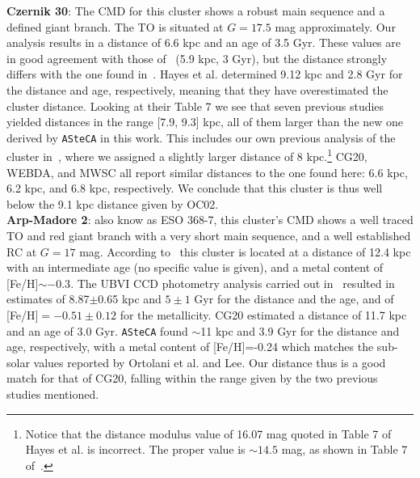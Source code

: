 \documentclass[draft]{aa}
\begin{document}
  \textbf{Czernik 30}: The CMD for this cluster shows a robust main sequence
  and a defined giant branch. The TO is situated at $G=17.5$ mag approximately.
  Our analysis results in a distance of 6.6 kpc and an age of 3.5 Gyr. These
  values are in good agreement with those of~\cite{Dias_2021} (5.9 kpc, 3 Gyr),
  but the distance strongly differs with the one found in~\cite{Hayes_2015}.
  Hayes et al. determined 9.12 kpc and 2.8 Gyr for the distance and age,
  respectively, meaning that they have overestimated the cluster distance.
  Looking at their Table 7 we see that seven previous studies yielded distances
  in the range [7.9, 9.3] kpc, all of them larger than the new one derived by
  \texttt{ASteCA} in this work. This includes our own previous analysis of the
  cluster in~\cite{Perren_2015}, where we assigned a slightly larger distance of
  8 kpc.\footnote{Notice that the distance modulus value of 16.07 mag quoted in
  Table 7 of Hayes et al. is incorrect. The proper value is $\sim14.5$ mag, as
  shown in Table 7 of~\cite{Perren_2015}.}
  CG20, WEBDA, and MWSC all report similar distances to the one found here:
  6.6 kpc, 6.2 kpc, and 6.8 kpc, respectively. We conclude that this cluster
  is thus well below the 9.1 kpc distance given by OC02.\\

  \textbf{Arp-Madore 2}: also know as ESO 368-7, this cluster's CMD shows
  a well traced TO and red giant branch with a very short main sequence, and a
  well established RC at $G=17$ mag.
  According to~\cite{Ortolani_1995} this cluster is located at a distance of
  12.4 kpc with an intermediate age (no specific value is given), and a metal
  content of [Fe/H]$\sim-0.3$.
  The UBVI CCD photometry analysis carried out in~\cite{Lee_1997} resulted in
  estimates of 8.87$\pm$0.65 kpc and $5\pm1$ Gyr for the distance and the age,
  and of [Fe/H]$=-0.51\pm0.12$ for the metallicity.
  CG20 estimated a distance of 11.7 kpc and an age of 3.0 Gyr.
  \texttt{ASteCA} found $\sim$11 kpc and 3.9 Gyr for the distance and
  age, respectively, with a metal content of [Fe/H]=-0.24 which matches the
  sub-solar values reported by Ortolani et al. and Lee.
  Our distance thus is a good match for that of CG20, falling within the range
  given by the two previous studies mentioned.\\
\end{document}
